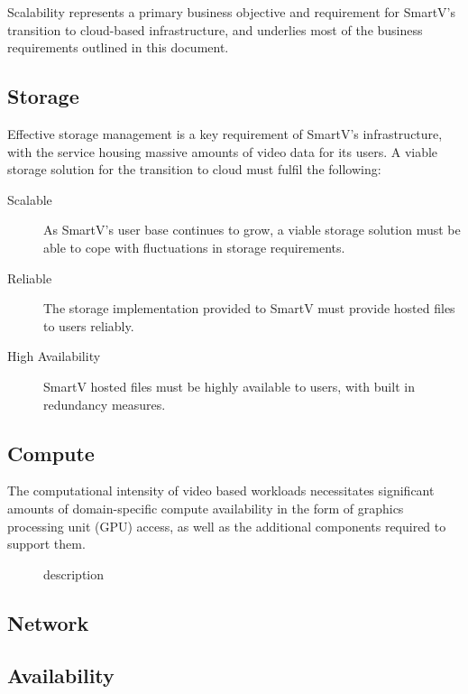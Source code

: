 \documentclass[]{article}
\begin{document}
Scalability represents a primary business objective and requirement for SmartV's transition to cloud-based infrastructure, and underlies most of the business requirements outlined in this document.

\subsection{Storage}

Effective storage management is a key requirement of SmartV's infrastructure, with the service housing massive amounts of video data for its users. A viable storage solution for the transition to cloud must fulfil the following:

\begin{description}
    \item[Scalable] As SmartV's user base continues to grow, a viable storage solution must be able to cope with fluctuations in storage requirements.
    \item[Reliable] The storage implementation provided to SmartV must provide hosted files to users reliably.
    \item[High Availability] SmartV hosted files must be highly available to users, with built in redundancy measures.
\end{description}



\subsection{Compute}

The computational intensity of video based workloads necessitates significant amounts of domain-specific compute availability in the form of graphics processing unit (GPU) access, as well as the additional components required to support them. 

\begin{description}
    \item[] description
\end{description}

\subsection{Network}

\subsection{Availability}
\end{document}
